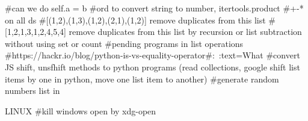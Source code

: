 #can we do self.a = b
#ord to convert string to number, itertools.product
#+-* on all ds
#[(1,2),(1,3),(1,2),(2,1),(1,2)] remove duplicates from this list
#[1,2,1,3,1,2,4,5,4] remove duplicates from this list by recursion or list subtraction without using set or count
#pending programs in list operations
#https://hackr.io/blog/python-is-vs-equality-operator#:~:text=What%
#convert JS shift, unsfhift methods to python programs (read collections, google shift list items by one in python, move one list item to another)
#generate random numbers list in 


LINUX
#kill windows open by xdg-open
